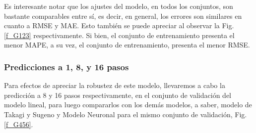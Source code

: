 \documentclass[12pt]{article}
\begin{document}
Es interesante notar que los ajustes del modelo, en todos los conjuntos, son bastante comparables entre sí, es decir, en general, los errores son similares en cuanto a RMSE y MAE. Esto también se puede apreciar al observar la Fig. \ref{f_G123} respectivamente. Si bien, el conjunto de entrenamiento presenta el menor MAPE, a su vez, el conjunto de entrenamiento, presenta el menor RMSE.

\subsubsection{Predicciones a 1, 8, y 16
	pasos}

Para efectos de apreciar la robustez de este modelo, llevaremos a cabo la predicción a 8 y 16 pasos respectivamente, en el conjunto de validación del modelo lineal, para luego compararlos con los demás modelos, a saber, modelo de Takagi y Sugeno y Modelo Neuronal para el mismo conjunto de validación, Fig. \ref{f_G456}.
\end{document}
